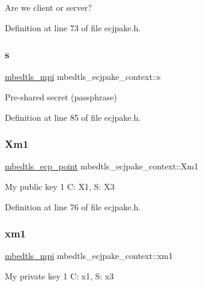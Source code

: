 Are we client or server? 

Definition at line 73 of file ecjpake.\+h.

\mbox{\label{structmbedtls__ecjpake__context_a532bce70f1a6652df129e28e7193357a}} 
\subsubsection{\texorpdfstring{s}{s}}
{\footnotesize\ttfamily \mbox{\hyperlink{structmbedtls__mpi}{mbedtls\+\_\+mpi}} mbedtls\+\_\+ecjpake\+\_\+context\+::s}

Pre-\/shared secret (passphrase) 

Definition at line 85 of file ecjpake.\+h.

\mbox{\label{structmbedtls__ecjpake__context_af48836057581977acd52e7bf079a3368}} 
\subsubsection{\texorpdfstring{Xm1}{Xm1}}
{\footnotesize\ttfamily \mbox{\hyperlink{structmbedtls__ecp__point}{mbedtls\+\_\+ecp\+\_\+point}} mbedtls\+\_\+ecjpake\+\_\+context\+::\+Xm1}

My public key 1 C\+: X1, S\+: X3 

Definition at line 76 of file ecjpake.\+h.

\mbox{\label{structmbedtls__ecjpake__context_adb90dac8428128ad65d595fc9904fdd3}} 
\subsubsection{\texorpdfstring{xm1}{xm1}}
{\footnotesize\ttfamily \mbox{\hyperlink{structmbedtls__mpi}{mbedtls\+\_\+mpi}} mbedtls\+\_\+ecjpake\+\_\+context\+::xm1}

My private key 1 C\+: x1, S\+: x3 

